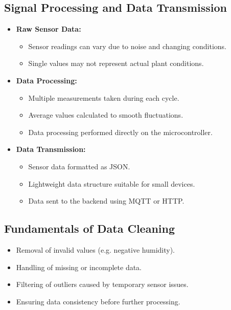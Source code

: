 \subsection{Signal Processing and Data Transmission}
\begin{itemize}
    \item \textbf{Raw Sensor Data:}
    \begin{itemize}
        \item Sensor readings can vary due to noise and changing conditions.
        \item Single values may not represent actual plant conditions.
    \end{itemize}

    \item \textbf{Data Processing:}
    \begin{itemize}
        \item Multiple measurements taken during each cycle.
        \item Average values calculated to smooth fluctuations.
        \item Data processing performed directly on the microcontroller.
    \end{itemize}

    \item \textbf{Data Transmission:}
    \begin{itemize}
        \item Sensor data formatted as JSON.
        \item Lightweight data structure suitable for small devices.
        \item Data sent to the backend using MQTT or HTTP.
    \end{itemize}
\end{itemize}

\subsection{Fundamentals of Data Cleaning}
\begin{itemize}
    \item Removal of invalid values (e.g. negative humidity).
    \item Handling of missing or incomplete data.
    \item Filtering of outliers caused by temporary sensor issues.
    \item Ensuring data consistency before further processing.
\end{itemize}

